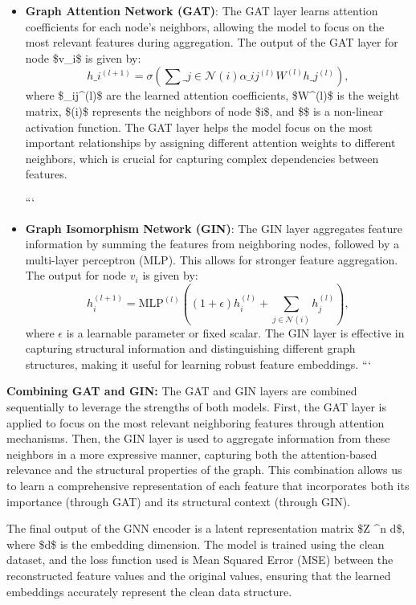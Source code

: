 \begin{itemize}
\item \textbf{Graph Attention Network (GAT)}: The GAT layer learns attention coefficients for each node's neighbors, allowing the model to focus on the most relevant features during aggregation. The output of the GAT layer for node \$v\_i\$ is given by:
\begin{equation}
h\_i^{(l+1)} = \sigma\left( \sum\_{j \in \mathcal{N}(i)} \alpha\_{ij}^{(l)} W^{(l)} h\_j^{(l)} \right),
\end{equation}
where \$\alpha\_{ij}^{(l)}\$ are the learned attention coefficients, \$W^{(l)}\$ is the weight matrix, \$(i)\$ represents the neighbors of node \$i\$, and \$\sigma\$ is a non-linear activation function. The GAT layer helps the model focus on the most important relationships by assigning different attention weights to different neighbors, which is crucial for capturing complex dependencies between features.

```
\item \textbf{Graph Isomorphism Network (GIN)}: The GIN layer aggregates feature information by summing the features from neighboring nodes, followed by a multi-layer perceptron (MLP). This allows for stronger feature aggregation. The output for node $v_i$ is given by:
\begin{equation}
h_i^{(l+1)} = \text{MLP}^{(l)}\left( (1 + \epsilon) h_i^{(l)} + \sum_{j \in \mathcal{N}(i)} h_j^{(l)} \right),
\end{equation}
where $\epsilon$ is a learnable parameter or fixed scalar. The GIN layer is effective in capturing structural information and distinguishing different graph structures, making it useful for learning robust feature embeddings.
```

\end{itemize}

\noindent \textbf{Combining GAT and GIN:} The GAT and GIN layers are combined sequentially to leverage the strengths of both models. First, the GAT layer is applied to focus on the most relevant neighboring features through attention mechanisms. Then, the GIN layer is used to aggregate information from these neighbors in a more expressive manner, capturing both the attention-based relevance and the structural properties of the graph. This combination allows us to learn a comprehensive representation of each feature that incorporates both its importance (through GAT) and its structural context (through GIN).

The final output of the GNN encoder is a latent representation matrix \$Z \in {}^{n \times d}\$, where \$d\$ is the embedding dimension. The model is trained using the clean dataset, and the loss function used is Mean Squared Error (MSE) between the reconstructed feature values and the original values, ensuring that the learned embeddings accurately represent the clean data structure.

